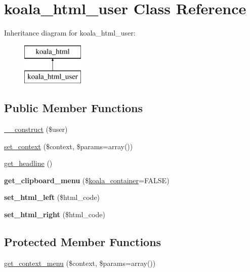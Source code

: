 \hypertarget{classkoala__html__user}{
\section{koala\_\-html\_\-user Class Reference}
\label{classkoala__html__user}
}
Inheritance diagram for koala\_\-html\_\-user:\begin{figure}[H]
\begin{center}
\leavevmode
\includegraphics[height=2.000000cm]{classkoala__html__user}
\end{center}
\end{figure}
\subsection*{Public Member Functions}
\begin{DoxyCompactItemize}
\item 
\hyperlink{classkoala__html__user_a67e456dadcff4d60a994de68a6a15c06}{\_\-\_\-construct} (\$user)
\item 
\hyperlink{classkoala__html__user_ab93dd683cf29249352c4b5fa9a1bb764}{set\_\-context} (\$context, \$params=array())
\item 
\hyperlink{classkoala__html__user_a0b5700cc16781f3fdfb89ea6336808ea}{get\_\-headline} ()
\item 
\hypertarget{classkoala__html__user_a213432986f5dac91c313530da7e5f2c7}{
{\bfseries get\_\-clipboard\_\-menu} (\$\hyperlink{classkoala__container}{koala\_\-container}=FALSE)}
\label{classkoala__html__user_a213432986f5dac91c313530da7e5f2c7}

\item 
\hypertarget{classkoala__html__user_a8a9f1c6aa9fc723732d45cc47645d846}{
{\bfseries set\_\-html\_\-left} (\$html\_\-code)}
\label{classkoala__html__user_a8a9f1c6aa9fc723732d45cc47645d846}

\item 
\hypertarget{classkoala__html__user_af329ead6cac3800187f5f7c85673463e}{
{\bfseries set\_\-html\_\-right} (\$html\_\-code)}
\label{classkoala__html__user_af329ead6cac3800187f5f7c85673463e}

\end{DoxyCompactItemize}
\subsection*{Protected Member Functions}
\begin{DoxyCompactItemize}
\item 
\hyperlink{classkoala__html__user_abe8594876e4a2ecdf43a641c4a547b11}{get\_\-context\_\-menu} (\$context, \$params=array())
\end{DoxyCompactItemize}


